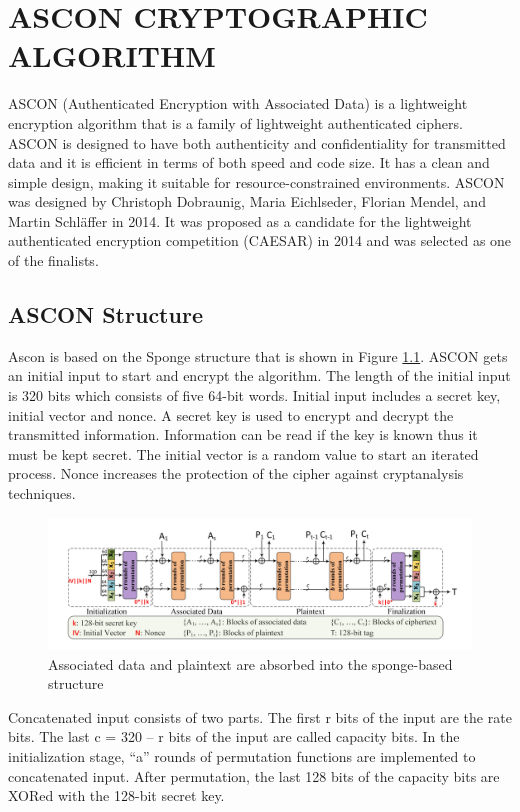 \clearpage
\chapter{ASCON CRYPTOGRAPHIC ALGORITHM}\label{Chascon}
ASCON (Authenticated Encryption with Associated Data) is a lightweight encryption algorithm that is a family of lightweight authenticated ciphers. ASCON is designed to have both authenticity and confidentiality for transmitted data and it is efficient in terms of both speed and code size. It has a clean and simple design, making it suitable for resource-constrained environments. 
ASCON was designed by Christoph Dobraunig, Maria Eichlseder, Florian Mendel, and Martin Schläffer in 2014. It was proposed as a candidate for the lightweight authenticated encryption competition (CAESAR) in 2014 and was selected as one of the finalists.

\section{ASCON Structure}
Ascon is based on the Sponge structure that is shown in Figure \ref{fig:sbox_structure}. ASCON gets an initial input to start and encrypt the algorithm. The length of the initial input is 320 bits which consists of five 64-bit words. Initial input includes a secret key, initial vector and nonce. A secret key is used to encrypt and decrypt the transmitted information. Information can be read if the key is known thus it must be kept secret. The initial vector is a random value to start an iterated process. Nonce increases the protection of the cipher against cryptanalysis techniques. 

\begin{figure}
    \centering
    \includegraphics[scale = 0.4]{ascon_sbox/s_box_structure.png}
    \caption{Associated data and plaintext are absorbed into the sponge-based structure}
    \label{fig:sbox_structure}
\end{figure}
Concatenated input consists of two parts. The first r bits of the input are the rate bits. The last c = 320 – r bits of the input are called capacity bits. In the initialization stage, “a” rounds of permutation functions are implemented to concatenated input. After permutation, the last 128 bits of the capacity bits are XORed with the 128-bit secret key. 

